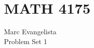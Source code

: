 \documentclass[letterpaper,10pt]{article}
\begin{document}
\part*{MATH 4175} 
\begin{flushright}
    Marc Evangelista\\
    Problem Set 1 \\
\end{flushright} 
\end{document}
